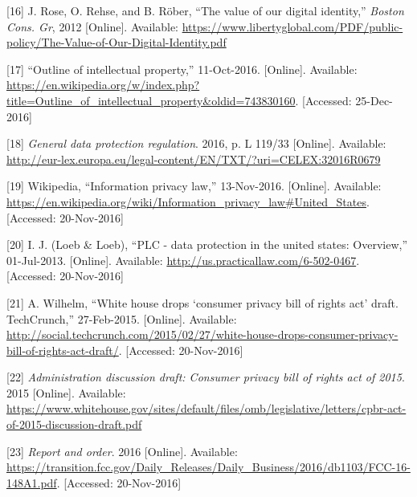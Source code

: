 \documentclass[12pt,english,a4paper,titlepage,cleardoublepage=empty,dottedtoc]{report}
\begin{document}
\hypertarget{ref-whitepaper_2012_the-value-of-our-digital-identity_definition}{}
{[}16{]} J. Rose, O. Rehse, and B. Röber, ``The value of our digital
identity,'' \emph{Boston Cons. Gr}, 2012 {[}Online{]}. Available:
\url{https://www.libertyglobal.com/PDF/public-policy/The-Value-of-Our-Digital-Identity.pdf}

\hypertarget{ref-web_2016_wikipedia_intellectual-property}{}
{[}17{]} ``Outline of intellectual property,'' 11-Oct-2016.
{[}Online{]}. Available:
\url{https://en.wikipedia.org/w/index.php?title=Outline_of_intellectual_property\&oldid=743830160}.
{[}Accessed: 25-Dec-2016{]}

\hypertarget{ref-regulation_2016_eu_general-data-protection-regulation_definition}{}
{[}18{]} \emph{General data protection regulation}. 2016, p. L 119/33
{[}Online{]}. Available:
\url{http://eur-lex.europa.eu/legal-content/EN/TXT/?uri=CELEX:32016R0679}

\hypertarget{ref-web_2016_wikipedia_information-privacy-law_us}{}
{[}19{]} Wikipedia, ``Information privacy law,'' 13-Nov-2016.
{[}Online{]}. Available:
\url{https://en.wikipedia.org/wiki/Information_privacy_law\#United_States}.
{[}Accessed: 20-Nov-2016{]}

\hypertarget{ref-web_2016_data-protection-laws-in-the-us}{}
{[}20{]} I. J. (Loeb \& Loeb), ``PLC - data protection in the united
states: Overview,'' 01-Jul-2013. {[}Online{]}. Available:
\url{http://us.practicallaw.com/6-502-0467}. {[}Accessed: 20-Nov-2016{]}

\hypertarget{ref-web_2015_white-house-releases-consumer-privacy-bill-draft}{}
{[}21{]} A. Wilhelm, ``White house drops `consumer privacy bill of
rights act' draft. TechCrunch,'' 27-Feb-2015. {[}Online{]}. Available:
\url{http://social.techcrunch.com/2015/02/27/white-house-drops-consumer-privacy-bill-of-rights-act-draft/}.
{[}Accessed: 20-Nov-2016{]}

\hypertarget{ref-bill-draft_2015_us_consumer-privacy-bill-of-rights-act_definition}{}
{[}22{]} \emph{Administration discussion draft: Consumer privacy bill of
rights act of 2015}. 2015 {[}Online{]}. Available:
\url{https://www.whitehouse.gov/sites/default/files/omb/legislative/letters/cpbr-act-of-2015-discussion-draft.pdf}

\hypertarget{ref-rules_2016_fcc_to-protect-broadband-consumer-privacy_sensitive-types-of-data}{}
{[}23{]} \emph{Report and order}. 2016 {[}Online{]}. Available:
\url{https://transition.fcc.gov/Daily_Releases/Daily_Business/2016/db1103/FCC-16-148A1.pdf}.
{[}Accessed: 20-Nov-2016{]}
\end{document}
